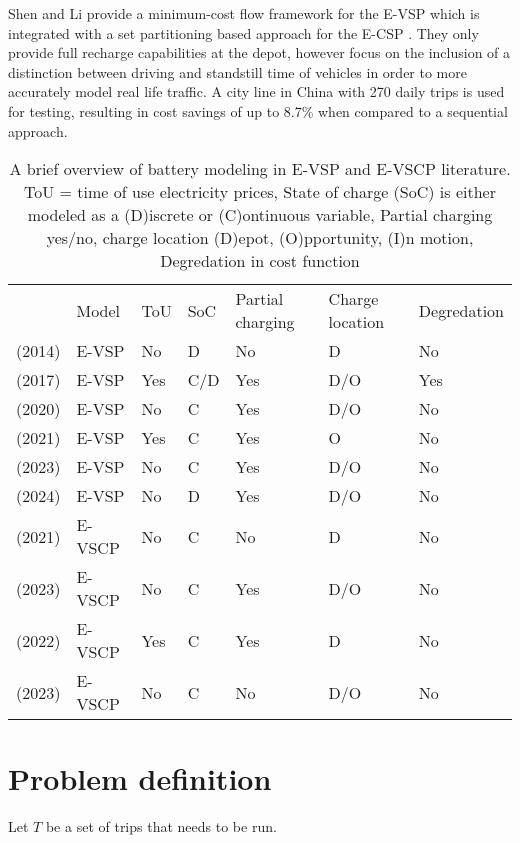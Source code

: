 \documentclass[]{article}
\begin{document}
Shen and Li provide a minimum-cost flow framework for the E-VSP which is integrated with a set partitioning based approach for the E-CSP \cite{SHEN2023}. They only provide full recharge capabilities at the depot, however focus on the inclusion of a distinction between driving and standstill time of vehicles in order to more accurately model real life traffic. A city line in China with 270 daily trips is used for testing, resulting in cost savings of up to 8.7\% when compared to a sequential approach.

\begin{table}[h]
  \centering
  \begin{tabular}{cllllll}
      \toprule
      & Model & ToU & SoC & Partial charging & Charge location & Degredation \\
      \cmidrule(lr){2-7}
      \cite{Li2014} (2014) & E-VSP & No & D & No & D & No \\
      \cite{vanKootenNiekerk2017} (2017) & E-VSP & Yes & C/D & Yes & D/O & Yes \\
      \cite{Olsen2020} (2020) & E-VSP & No & C & Yes & D/O & No \\ 
      \cite{Jiang2021} (2021) & E-VSP & Yes & C & Yes & O & No \\ 
      \cite{Parmentier2023} (2023) & E-VSP & No & C & Yes & D/O & No \\
      \cite{deVos2024} (2024) & E-VSP & No & D & Yes & D/O & No \\ 
      \cite{PERUMAL2021105268} (2021) & E-VSCP & No & C & No & D & No  \\
      \cite{SISTIG2023120915} (2023) & E-VSCP & No & C & Yes & D/O & No \\
      \cite{su14063627} (2022) & E-VSCP & Yes & C & Yes & D & No \\
      \cite{SHEN2023} (2023) & E-VSCP & No & C & No & D/O & No \\
      \bottomrule
  \end{tabular}
  \caption{A brief overview of battery modeling in E-VSP and E-VSCP literature. ToU = time of use electricity prices, State of charge (SoC) is either modeled as a (D)iscrete or (C)ontinuous variable, Partial charging yes/no, charge location (D)epot, (O)pportunity, (I)n motion, Degredation in cost function}
  \label{tab:evscp-lit}
\end{table}

\section{Problem definition}
Let $T$ be a set of trips that needs to be run. 
\printbibliography
\end{document}
